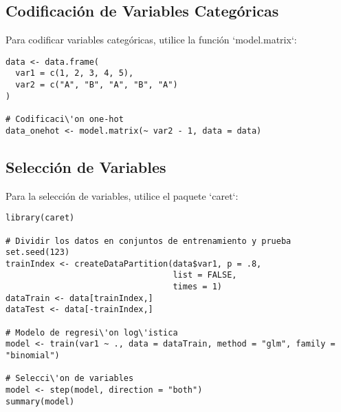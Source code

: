 \subsection{Codificaci\'on de Variables Categ\'oricas}

Para codificar variables categ\'oricas, utilice la funci\'on `model.matrix`:
\begin{verbatim}
data <- data.frame(
  var1 = c(1, 2, 3, 4, 5),
  var2 = c("A", "B", "A", "B", "A")
)

# Codificaci\'on one-hot
data_onehot <- model.matrix(~ var2 - 1, data = data)
\end{verbatim}

\subsection{Selecci\'on de Variables}

Para la selecci\'on de variables, utilice el paquete `caret`:
\begin{verbatim}
library(caret)

# Dividir los datos en conjuntos de entrenamiento y prueba
set.seed(123)
trainIndex <- createDataPartition(data$var1, p = .8, 
                                  list = FALSE, 
                                  times = 1)
dataTrain <- data[trainIndex,]
dataTest <- data[-trainIndex,]

# Modelo de regresi\'on log\'istica
model <- train(var1 ~ ., data = dataTrain, method = "glm", family = "binomial")

# Selecci\'on de variables
model <- step(model, direction = "both")
summary(model)
\end{verbatim}

